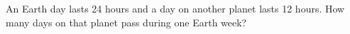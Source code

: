 An Earth day lasts 24 hours and a day on another planet lasts 12 hours. How many days on that planet pass during one Earth week?
